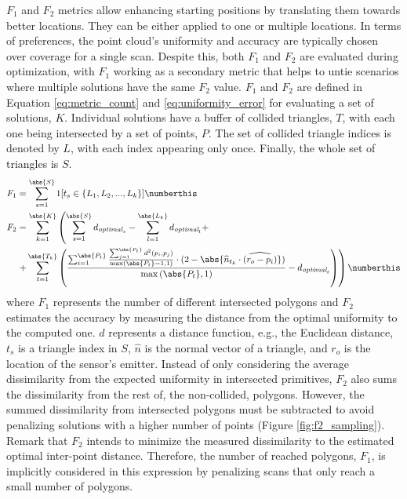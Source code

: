 $F_1$ and $F_2$ metrics allow enhancing starting positions by translating them towards better locations. They can be either applied to one or multiple locations. In terms of preferences, the point cloud's uniformity and accuracy are typically chosen over coverage for a single scan. Despite this, both $F_1$ and $F_2$ are evaluated during optimization, with $F_1$ working as a secondary metric that helps to untie scenarios where multiple solutions have the same $F_2$ value. $F_1$ and $F_2$ are defined in Equation \ref{eq:metric_count} and \ref{eq:uniformity_error} for evaluating a set of solutions, $K$. Individual solutions have a buffer of collided triangles, $T$, with each one being intersected by a set of points, $P$. The set of collided triangle indices is denoted by $L$, with each index appearing only once. Finally, the whole set of triangles is $S$.
\begin{align*}
    \textit{F}_{1} &= \sum_{s=1}^{\abs{S}} 1[t_s \in \{L_1, L_2, ..., L_k\}]
    \numberthis \label{eq:metric_count}\\
    \textit{F}_{2} &= \sum_{k=1}^{\abs{K}} \left(\sum_{s=1}^{\abs{S}} d_{\textit{optimal}_{s}} - \sum_{l=1}^{\abs{L_k}} d_{\textit{optimal}_{l}}  +\right.\\ & 
    \left. + \sum_{t=1}^{\abs{T_k}} \left(\frac{\sum_{i=1}^{\abs{P_t}} \frac{\sum_{j=1}^{\abs{P_t}} d^{2}(p_i, p_j)}{\max\left(\abs{P_t} - 1, 1\right)} \cdot (2 - \abs{\widehat{n}_{t_{k}} \cdot \widehat{\left(r_{o} - p_{i}\right)}})}{\max\left(\abs{P_t}, 1\right)} - d_{\textit{optimal}_{t}}\right)\right)
    \numberthis \label{eq:uniformity_error}
\end{align*}
where $F_1$ represents the number of different intersected polygons and $F_2$ estimates the accuracy by measuring the distance from the optimal uniformity to the computed one. $d$ represents a distance function, e.g., the Euclidean distance, $t_s$ is a triangle index in $S$, $\hat{n}$ is the normal vector of a triangle, and $r_o$ is the location of the sensor's emitter. Instead of only considering the average dissimilarity from the expected uniformity in intersected primitives, $F_2$ also sums the dissimilarity from the rest of, the non-collided, polygons. However, the summed dissimilarity from intersected polygons must be subtracted to avoid penalizing solutions with a higher number of points (Figure \ref{fig:f2_sampling}). Remark that $F_2$ intends to minimize the measured dissimilarity to the estimated optimal inter-point distance. Therefore, the number of reached polygons, $F_1$, is implicitly considered in this expression by penalizing scans that only reach a small number of polygons.


